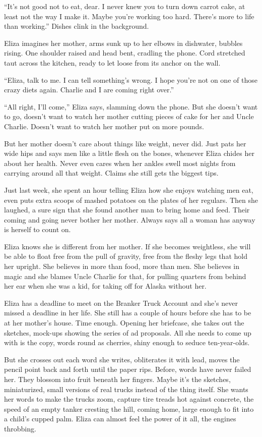 \documentclass[twoside,10pt]{book}
\begin{document}
``It's not good not to eat, dear. I never knew you to turn down carrot
cake, at least not the way I make it. Maybe you're working too hard.
There's more to life than working.'' Dishes clink in the back­ground.

Eliza imagines her mother, arms sunk up to her elbows in dishwater,
bubbles rising. One shoulder raised and head bent, cradling the phone.
Cord stretched taut across the kitchen, ready to let loose from its
anchor on the wall.

``Eliza, talk to me. I can tell something's wrong. I hope you're not on
one of those crazy diets again. Charlie and I are coming right over.''

``All right, I'll come,'' Eliza says, slamming down the phone. But she
doesn't want to go, doesn't want to watch her mother cutting pieces of
cake for her and Uncle Charlie. Doesn't want to watch her mother put on
more pounds.

But her mother doesn't care about things like weight, never did. Just
pats her wide hips and says men like a little flesh on the bones,
whenever Eliza chides her about her health. Never even cares when her
ankles swell most nights from carrying around all that weight. Claims
she still gets the biggest tips.

Just last week, she spent an hour telling Eliza how she enjoys watching
men eat, even puts extra scoops of mashed potatoes on the plates of her
regulars. Then she laughed, a sure sign that she found another man to
bring home and feed. Their coming and going never bother her mother.
Always says all a woman has anyway is herself to count on.

Eliza knows she is different from her mother. If she becomes weightless,
she will be able to float free from the pull of gravity, free from the
fleshy legs that hold her upright. She believes in more than food, more
than men. She believes in magic and she blames Uncle Charlie for that,
for pulling quarters from behind her ear when she was a kid, for taking
off for Alaska without her.

Eliza has a deadline to meet on the Branker Truck Account and she's
never missed a deadline in her life. She still has a couple of hours
before she has to be at her mother's house. Time enough. Opening her
briefcase, she takes out the sketches, mock-ups showing the series of ad
proposals. All she needs to come up with is the copy, words round as
cherries, shiny enough to seduce ten-year-olds.

But she crosses out each word she writes, obliterates it with lead,
moves the pencil point back and forth until the paper rips. Before,
words have never failed her. They blossom into fruit beneath her
fingers. Maybe it's the sketches, miniaturized, small versions of real
trucks instead of the thing itself. She wants her words to make the
trucks zoom, capture tire treads hot against concrete, the speed of an
empty tanker cresting the hill, coming home, large enough to fit into a
child's cupped palm. Eliza can almost feel the power of it all, the
engines throbbing.
\end{document}
